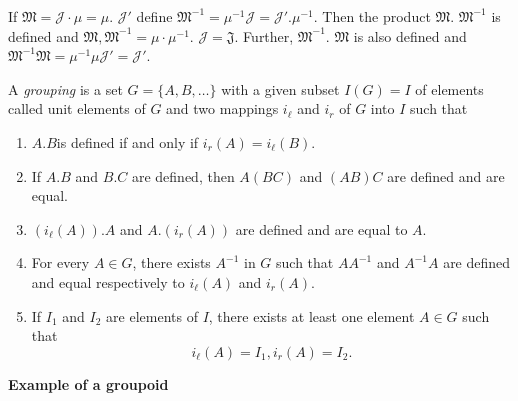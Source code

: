 If $\mathfrak{M} = \mathcal{J} \cdot \mu = \mu$. $\mathcal{J}'$ define
$\mathfrak{M}^{-1} = \mu^{-1} \mathcal{J} =
\mathcal{J}'. \mu^{-1}$. Then the product
$\mathfrak{M}$. $\mathfrak{M} ^{-1}$ is defined and $\mathfrak{M},
\mathfrak{M} ^{-1} = \mu \cdot \mu^{-1}$. $\mathcal{J} =
\mathfrak{J}$. Further, $\mathfrak{M} ^{-1}$. $\mathfrak{M} $ is also
defined and $\mathfrak{M}^{-1} \mathfrak{M} = \mu^{-1} \mu
\mathcal{J}' = \mathcal{J}' $. 

\begin{defi*}
  A {\em grouping} is a set $G = \{ A, B, \ldots \}$ with a given
  subset $I(G) = I$ of elements called unit elements of $G$ and two
  mappings $i_\ell$ and $i_r$ of $G$ into $I$ such that 
  \begin{enumerate}[\rm 1.]
  \item $A. B$\pageoriginale is defined if and only if $i_r(A) = i_\ell(B)$.
  \item If $A.  B$ and $B.C$ are defined, then $A(BC)$ and $(AB)C$ are
    defined and are equal. 
  \item $(i_\ell(A)). A$ and $A. (i_r(A))$ are defined and are equal to $A$.
  \item For every $A \in G$, there exists $A^{-1}$ in $G$ such that
    $AA^{-1}$ and $A^{-1}A$ are defined and equal respectively to
    $i_\ell(A)$ and $i_r(A)$. 
  \item If $I_1$ and $I_2$ are elements of $I$, there exists at least
    one element $A \in G$ such that  
    $$
    i_\ell(A) = I_1,  i_r(A) = I_2.
    $$
  \end{enumerate}
\end{defi*}

\noindent
\textbf{Example of a groupoid}

